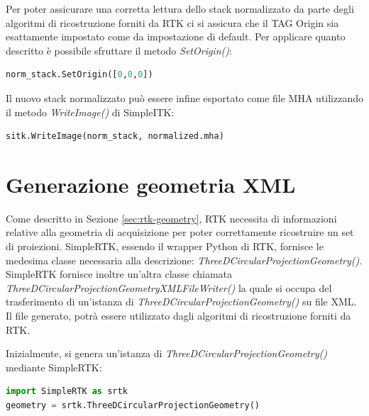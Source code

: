 \documentclass[a4paper,12pt, doubleside]{report}
\begin{document}
                Per poter assicurare una corretta lettura dello stack normalizzato da parte degli algoritmi di ricostruzione forniti da RTK ci si assicura che il TAG Origin sia esattamente impostato come da impostazione di default. Per applicare quanto descritto è possibile sfruttare il metodo \textit{SetOrigin()}:
                
                \begin{lstlisting}[language=python, frame=bt]
norm_stack.SetOrigin([0,0,0])
                \end{lstlisting}
                
                Il nuovo stack normalizzato può essere infine esportato come file MHA utilizzando il metodo \textit{WriteImage()} di SimpleITK:
                
                \begin{lstlisting}[language=python, frame=bt]
sitk.WriteImage(norm_stack, normalized.mha)
                \end{lstlisting}
                
        \section{Generazione geometria XML}
            \label{sec:rtk-build-geometry}
            \par
                Come descritto in Sezione \ref{sec:rtk-geometry}, RTK necessita di informazioni relative alla geometria di acquisizione per poter correttamente ricostruire un set di proiezioni. SimpleRTK, essendo il wrapper Python di RTK, fornisce le medesima classe necessaria alla descrizione: \textit{ThreeDCircularProjectionGeometry()}. SimpleRTK fornisce inoltre un'altra classe chiamata \textit{ThreeDCircularProjectionGeometryXMLFileWriter()} la quale si occupa del trasferimento di un'istanza di \textit{ThreeDCircularProjectionGeometry()} su file XML. Il file generato, potrà essere utilizzato dagli algoritmi di ricostruzione forniti da RTK.
                
            \bigskip
            \par
                Inizialmente, si genera un'istanza di \textit{ThreeDCircularProjectionGeometry()} mediante SimpleRTK:
                \begin{lstlisting}[language=python, frame=bt]
import SimpleRTK as srtk
geometry = srtk.ThreeDCircularProjectionGeometry()
                \end{lstlisting}
                    
\end{document}
